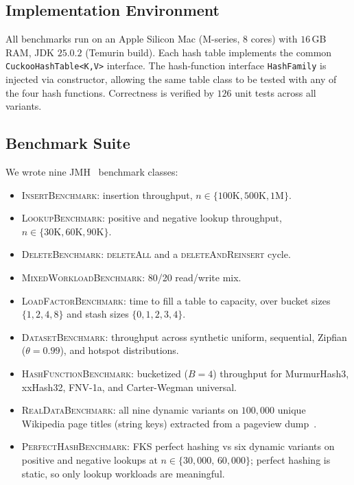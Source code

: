 \documentclass[10pt,journal,compsoc]{IEEEtran}
\begin{document}
\subsection{Implementation Environment}
All benchmarks run on an Apple Silicon Mac (M-series, 8 cores) with $16$\,GB RAM, JDK $25.0.2$ (Temurin build). Each hash table implements the common \texttt{CuckooHashTable<K,V>} interface. The hash-function interface \texttt{HashFamily} is injected via constructor, allowing the same table class to be tested with any of the four hash functions. Correctness is verified by $126$ unit tests across all variants.

\subsection{Benchmark Suite}
We wrote nine JMH~\cite{jmh} benchmark classes:
\begin{itemize}
    \item \textsc{InsertBenchmark}: insertion throughput, $n\in\{100\mathrm{K}, 500\mathrm{K}, 1\mathrm{M}\}$.
    \item \textsc{LookupBenchmark}: positive and negative lookup throughput, $n\in\{30\mathrm{K}, 60\mathrm{K}, 90\mathrm{K}\}$.
    \item \textsc{DeleteBenchmark}: \textsc{deleteAll} and a \textsc{deleteAndReinsert} cycle.
    \item \textsc{MixedWorkloadBenchmark}: 80/20 read/write mix.
    \item \textsc{LoadFactorBenchmark}: time to fill a table to capacity, over bucket sizes $\{1,2,4,8\}$ and stash sizes $\{0,1,2,3,4\}$.
    \item \textsc{DatasetBenchmark}: throughput across synthetic uniform, sequential, Zipfian ($\theta = 0.99$), and hotspot distributions.
    \item \textsc{HashFunctionBenchmark}: bucketized ($B=4$) throughput for MurmurHash3, xxHash32, FNV-1a, and Carter-Wegman universal.
    \item \textsc{RealDataBenchmark}: all nine dynamic variants on $100{,}000$ unique Wikipedia page titles (string keys) extracted from a pageview dump~\cite{wikipedia_pageviews}.
    \item \textsc{PerfectHashBenchmark}: FKS perfect hashing vs six dynamic variants on positive and negative lookups at $n\in\{30{,}000,\,60{,}000\}$; perfect hashing is static, so only lookup workloads are meaningful.
\end{itemize}
\end{document}
